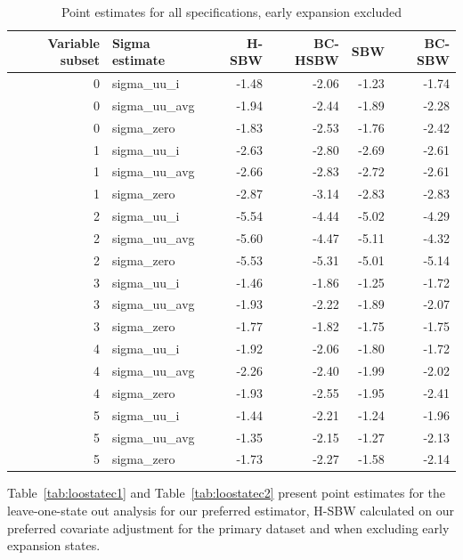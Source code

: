 \documentclass[12pt]{article}
\begin{document}
\begin{table}[ht]
\centering
\begin{tabular}{rlrrrr}
  \toprule
Variable subset & Sigma estimate & H-SBW & BC-HSBW & SBW & BC-SBW \\ 
  \midrule
0 & sigma\_uu\_i & -1.48 & -2.06 & -1.23 & -1.74 \\ 
  0 & sigma\_uu\_avg & -1.94 & -2.44 & -1.89 & -2.28 \\ 
  0 & sigma\_zero & -1.83 & -2.53 & -1.76 & -2.42 \\ 
  1 & sigma\_uu\_i & -2.63 & -2.80 & -2.69 & -2.61 \\ 
  1 & sigma\_uu\_avg & -2.66 & -2.83 & -2.72 & -2.61 \\ 
  1 & sigma\_zero & -2.87 & -3.14 & -2.83 & -2.83 \\ 
  2 & sigma\_uu\_i & -5.54 & -4.44 & -5.02 & -4.29 \\ 
  2 & sigma\_uu\_avg & -5.60 & -4.47 & -5.11 & -4.32 \\ 
  2 & sigma\_zero & -5.53 & -5.31 & -5.01 & -5.14 \\ 
  3 & sigma\_uu\_i & -1.46 & -1.86 & -1.25 & -1.72 \\ 
  3 & sigma\_uu\_avg & -1.93 & -2.22 & -1.89 & -2.07 \\ 
  3 & sigma\_zero & -1.77 & -1.82 & -1.75 & -1.75 \\ 
  4 & sigma\_uu\_i & -1.92 & -2.06 & -1.80 & -1.72 \\ 
  4 & sigma\_uu\_avg & -2.26 & -2.40 & -1.99 & -2.02 \\ 
  4 & sigma\_zero & -1.93 & -2.55 & -1.95 & -2.41 \\ 
  5 & sigma\_uu\_i & -1.44 & -2.21 & -1.24 & -1.96 \\ 
  5 & sigma\_uu\_avg & -1.35 & -2.15 & -1.27 & -2.13 \\ 
  5 & sigma\_zero & -1.73 & -2.27 & -1.58 & -2.14 \\ 
   \bottomrule
\end{tabular}
   \caption{Point estimates for all specifications, early expansion excluded}
    \label{tab:secondaryptests}
\end{table}

Table~\ref{tab:loostatec1} and Table~\ref{tab:loostatec2} present point estimates for the leave-one-state out analysis for our preferred estimator, H-SBW calculated on our preferred covariate adjustment for the primary dataset and when excluding early expansion states.
\end{document}
